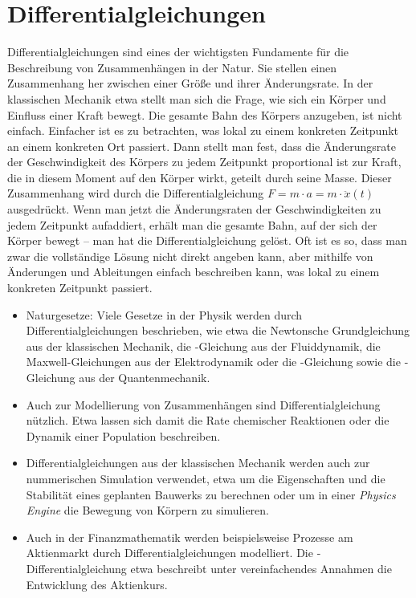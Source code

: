 \chapter{Differentialgleichungen}

Differentialgleichungen sind eines der wichtigsten Fundamente für die Beschreibung von Zusammenhängen in der Natur. Sie stellen einen Zusammenhang her zwischen einer Größe und ihrer Änderungsrate. In der klassischen Mechanik etwa stellt man sich die Frage, wie sich ein Körper und Einfluss einer Kraft bewegt. Die gesamte Bahn des Körpers anzugeben, ist nicht einfach. Einfacher ist es zu betrachten, was lokal zu einem konkreten Zeitpunkt an einem konkreten Ort passiert. Dann stellt man fest, dass die Änderungsrate der Geschwindigkeit des Körpers zu jedem Zeitpunkt proportional ist zur Kraft, die in diesem Moment auf den Körper wirkt, geteilt durch seine Masse. Dieser Zusammenhang wird durch die Differentialgleichung $F=m\cdot a = m \cdot \ddot{x}(t)$ ausgedrückt. Wenn man jetzt die Änderungsraten der Geschwindigkeiten zu jedem Zeitpunkt aufaddiert, erhält man die gesamte Bahn, auf der sich der Körper bewegt -- man hat die Differentialgleichung gelöst. Oft ist es so, dass man zwar die vollständige Lösung nicht direkt angeben kann, aber mithilfe von Änderungen und Ableitungen einfach beschreiben kann, was lokal zu einem konkreten Zeitpunkt passiert.

\begin{itemize}
    \item Naturgesetze: Viele Gesetze in der Physik werden durch Differentialgleichungen beschrieben, wie etwa die Newtonsche Grundgleichung aus der klassischen Mechanik, die -Gleichung aus der Fluiddynamik, die Maxwell-Gleichungen aus der Elektrodynamik oder die -Gleichung sowie die -Gleichung aus der Quantenmechanik.
    \item Auch zur Modellierung von Zusammenhängen sind Differentialgleichung nützlich. Etwa lassen sich damit die Rate chemischer Reaktionen oder die Dynamik einer Population beschreiben.
    \item Differentialgleichungen aus der klassischen Mechanik werden auch zur nummerischen Simulation verwendet, etwa um die Eigenschaften und die Stabilität eines geplanten Bauwerks zu berechnen oder um in einer \emph{Physics Engine} die Bewegung von Körpern zu simulieren.
    \item Auch in der Finanzmathematik werden beispielsweise Prozesse am Aktienmarkt durch Differentialgleichungen modelliert. Die -Differentialgleichung etwa beschreibt unter vereinfachendes Annahmen die Entwicklung des Aktienkurs.
\end{itemize}

